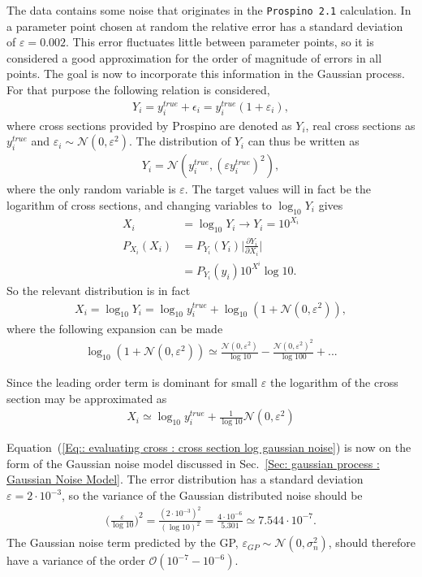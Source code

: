 \documentclass[twoside,english]{uiofysmaster}
\begin{document}
The data contains some noise that originates in the \verb|Prospino 2.1| calculation. In a parameter point chosen at random the relative error has a standard deviation of $\varepsilon = 0.002$. This error fluctuates little between parameter points, so it is considered a good approximation for the order of magnitude of errors in all points. The goal is now to incorporate this information in the Gaussian process. For that purpose the following relation is considered,
\begin{align}\label{Eq:: cross section w/ error}
Y_i = y^{true}_i + \epsilon_i = y_i^{true}(1 + \varepsilon_i),
\end{align}
where cross sections provided by Prospino are denoted as $Y_i$, real cross sections as $y_i^{true}$ and $\varepsilon_i \sim \mathcal{N}(0, \varepsilon^2)$. The distribution of $Y_i$ can thus be written as 
\begin{align}
Y_i = \mathcal{N}(y_i^{true}, (\varepsilon y_i^{true})^2),
\end{align}
where the only random variable is $\varepsilon$. The target values will in fact be the logarithm of cross sections, and changing variables to $\log_{10}Y_i$ gives
\begin{align}
X_i &= \log_{10} Y_i \rightarrow Y_i = 10^{X_i}\\
P_{X_i} (X_i) &= P_{Y_i} (Y_i) \Big|\frac{\partial Y_i}{\partial X_i}\Big|\\
&= P_{Y_i} (y_i) 10^{X^i} \log 10.
\end{align}
So the relevant distribution is in fact
\begin{align*}
X_i = \log_{10} Y_i = \log_{10} y_i^{true} + \log_{10} (1 + \mathcal{N}(0, \varepsilon^2)),
\end{align*}
where the following expansion can be made
\begin{align}
\log_{10} (1 + \mathcal{N}(0, \varepsilon^2)) \simeq \frac{\mathcal{N} (0, \varepsilon^2)}{\log 10} - \frac{\mathcal{N} (0, \varepsilon^2)^2}{\log 100} +...
\end{align}

Since the leading order term is dominant for small $\varepsilon$ the logarithm of the cross section may be approximated as
\begin{align}\label{Eq:: evaluating cross : cross section log gaussian noise}
X_i \simeq \log_{10} y_i^{true} + \frac{1}{\log 10} \mathcal{N} (0, \varepsilon^2)
\end{align}

Equation~(\ref{Eq:: evaluating cross : cross section log gaussian noise}) is now on the form of the Gaussian noise model discussed in Sec.~\ref{Sec: gaussian process : Gaussian Noise Model}. The error distribution has a standard deviation $\varepsilon = 2 \cdot 10^{-3}$, so the variance of the Gaussian distributed noise should be
\begin{align*}
\Bigg( \frac{\varepsilon}{\log 10} \Bigg)^2 = \frac{(2 \cdot 10^{-3})^2}{(\log 10)^2} = \frac{4 \cdot 10^{-6}}{5.301} \simeq 7.544 \cdot 10^{-7}.
\end{align*}
The Gaussian noise term predicted by the GP, $\varepsilon_{GP} \sim \mathcal{N}(0, \sigma_n^2)$, should therefore have a variance of the order $\mathcal{O}(10^{-7}-10^{-6})$.
\end{document}
